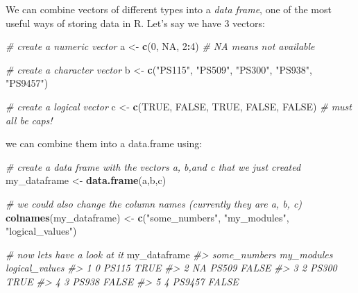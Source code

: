 \documentclass[
]{book}
\newenvironment{Shaded}{\begin{snugshade}}{\end{snugshade}}
\newcommand{\CommentTok}[1]{\textcolor[rgb]{0.56,0.35,0.01}{\textit{#1}}}
\newcommand{\ConstantTok}[1]{\textcolor[rgb]{0.56,0.35,0.01}{#1}}
\newcommand{\DecValTok}[1]{\textcolor[rgb]{0.00,0.00,0.81}{#1}}
\newcommand{\FunctionTok}[1]{\textcolor[rgb]{0.13,0.29,0.53}{\textbf{#1}}}
\newcommand{\NormalTok}[1]{#1}
\newcommand{\OtherTok}[1]{\textcolor[rgb]{0.56,0.35,0.01}{#1}}
\newcommand{\SpecialCharTok}[1]{\textcolor[rgb]{0.81,0.36,0.00}{\textbf{#1}}}
\newcommand{\StringTok}[1]{\textcolor[rgb]{0.31,0.60,0.02}{#1}}
\begin{document}
We can combine vectors of different types into a \emph{data frame}, one of the most useful ways of storing data in R. Let's say we have 3 vectors:

\begin{Shaded}
\begin{Highlighting}[]
\CommentTok{\# create a numeric vector }
\NormalTok{a }\OtherTok{\textless{}{-}} \FunctionTok{c}\NormalTok{(}\DecValTok{0}\NormalTok{, }\ConstantTok{NA}\NormalTok{, }\DecValTok{2}\SpecialCharTok{:}\DecValTok{4}\NormalTok{)  }\CommentTok{\# NA means not available}

\CommentTok{\# create a character vector}
\NormalTok{b }\OtherTok{\textless{}{-}}  \FunctionTok{c}\NormalTok{(}\StringTok{"PS115"}\NormalTok{, }\StringTok{"PS509"}\NormalTok{, }\StringTok{"PS300"}\NormalTok{, }\StringTok{"PS938"}\NormalTok{, }\StringTok{"PS9457"}\NormalTok{)}

\CommentTok{\# create a logical vector}
\NormalTok{c }\OtherTok{\textless{}{-}} \FunctionTok{c}\NormalTok{(}\ConstantTok{TRUE}\NormalTok{, }\ConstantTok{FALSE}\NormalTok{, }\ConstantTok{TRUE}\NormalTok{, }\ConstantTok{FALSE}\NormalTok{, }\ConstantTok{FALSE}\NormalTok{)  }\CommentTok{\# must all be caps!}
\end{Highlighting}
\end{Shaded}

we can combine them into a data.frame using:

\begin{Shaded}
\begin{Highlighting}[]
\CommentTok{\# create a data frame with the vectors a, b,and c that we just created}
\NormalTok{my\_dataframe }\OtherTok{\textless{}{-}} \FunctionTok{data.frame}\NormalTok{(a,b,c)}

\CommentTok{\# we could also change the column names (currently they are a, b, c)}
\FunctionTok{colnames}\NormalTok{(my\_dataframe) }\OtherTok{\textless{}{-}} \FunctionTok{c}\NormalTok{(}\StringTok{"some\_numbers"}\NormalTok{, }\StringTok{"my\_modules"}\NormalTok{, }\StringTok{"logical\_values"}\NormalTok{)}

\CommentTok{\# now let\textquotesingle{}s have a look at it}
\NormalTok{my\_dataframe}
\CommentTok{\#\textgreater{}   some\_numbers my\_modules logical\_values}
\CommentTok{\#\textgreater{} 1            0      PS115           TRUE}
\CommentTok{\#\textgreater{} 2           NA      PS509          FALSE}
\CommentTok{\#\textgreater{} 3            2      PS300           TRUE}
\CommentTok{\#\textgreater{} 4            3      PS938          FALSE}
\CommentTok{\#\textgreater{} 5            4     PS9457          FALSE}
\end{Highlighting}
\end{Shaded}
\end{document}
